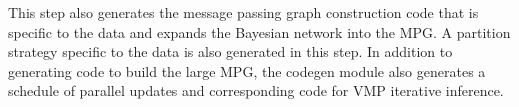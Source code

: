 This step also generates the message passing graph construction code that is
specific to the data and expands the Bayesian network into the MPG. A partition
strategy specific to the data is also generated in this step.  In addition to
generating code to build the large MPG, the codegen module also generates a
schedule of parallel updates and corresponding code for VMP iterative
inference. 

%




